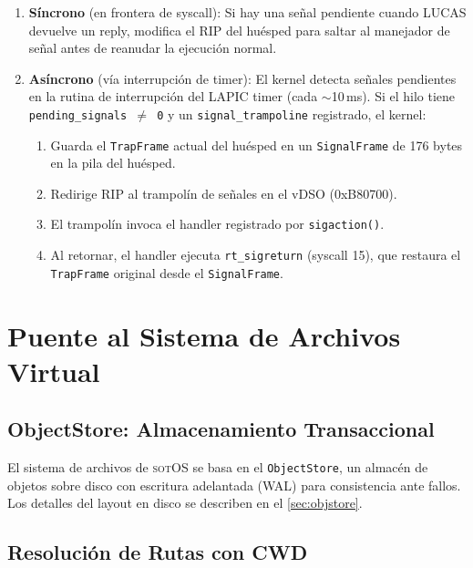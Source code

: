 \documentclass[11pt,twoside,openright]{book}
\theoremstyle{definition}
\theoremstyle{plain}
\theoremstyle{remark}
\newcommand{\sotos}{\textsc{sotOS}}
\begin{document}
\begin{enumerate}
    \item \textbf{Síncrono} (en frontera de syscall): Si hay una señal pendiente
          cuando LUCAS devuelve un reply, modifica el RIP del huésped para saltar
          al manejador de señal antes de reanudar la ejecución normal.

    \item \textbf{Asíncrono} (vía interrupción de timer): El kernel detecta señales
          pendientes en la rutina de interrupción del LAPIC timer (cada $\sim$10\,ms).
          Si el hilo tiene \texttt{pending\_signals $\neq$ 0} y un
          \texttt{signal\_trampoline} registrado, el kernel:
          \begin{enumerate}
              \item Guarda el \texttt{TrapFrame} actual del huésped en un
                    \texttt{SignalFrame} de 176 bytes en la pila del huésped.
              \item Redirige RIP al trampolín de señales en el vDSO (0xB80700).
              \item El trampolín invoca el handler registrado por \texttt{sigaction()}.
              \item Al retornar, el handler ejecuta \texttt{rt\_sigreturn} (syscall 15),
                    que restaura el \texttt{TrapFrame} original desde el
                    \texttt{SignalFrame}.
          \end{enumerate}
\end{enumerate}

\section{Puente al Sistema de Archivos Virtual}
\label{sec:lucas-vfs}

\subsection{ObjectStore: Almacenamiento Transaccional}

El sistema de archivos de \sotos{} se basa en el \texttt{ObjectStore}, un almacén
de objetos sobre disco con escritura adelantada (WAL) para consistencia ante
fallos. Los detalles del layout en disco se describen en el \cref{sec:objstore}.

\subsection{Resolución de Rutas con CWD}
\end{document}
